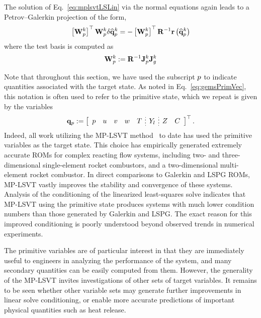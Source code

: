 The solution of Eq.~\ref{eq:mplsvtLSLin} via the normal equations again leads to a Petrov--Galerkin projection of the form,
%
\begin{equation}
    \left[\testBasisPrim^\newtonIdx\right]^\top \testBasisPrim^{\newtonIdx} \delta \primVecCoef^{\newtonIdx} = - \left[\testBasisPrim^{\newtonIdx}\right]^\top \resScaleInv \resFunc{\primVecCoef^{\newtonIdx}}
\end{equation}
%
where the test basis is computed as
%
\begin{equation}
    \testBasisPrim^{\newtonIdx} \defEq \resScaleInv \jacobPrim^{\newtonIdx} \jacobDecode^{\newtonIdx}
\end{equation}
%

Note that throughout this section, we have used the subscript $p$ to indicate quantities associated with the target state. As noted in Eq.~\ref{eq:gemsPrimVec}, this notation is often used to refer to the primitive state, which we repeat is given by the variables
%
\begin{equation}
    \primVec \defEq \left[
    \begin{array}{ccccc;{2pt/2pt}c;{2pt/2pt}cc}
    \pressure & \velX & \velY & \velZ & \temperature & \mfSpec & \mixFrac & \progVar
    \end{array}
    \right]^\top.
\end{equation}
%
Indeed, all work utilizing the MP-LSVT method~\cite{Huang2022,Wentland2021,Huang2022a} to date has used the primitive variables as the target state. This choice has empirically generated extremely accurate ROMs for complex reacting flow systems, including two- and three-dimensional single-element rocket combustors, and a two-dimensional multi-element rocket combustor. In direct comparisons to Galerkin and LSPG ROMs, MP-LSVT vastly improves the stability and convergence of these systems. Analysis of the conditioning of the linearized least-squares solve indicates that MP-LSVT using the primitive state produces systems with much lower condition numbers than those generated by Galerkin and LSPG. The exact reason for this improved conditioning is poorly understood beyond observed trends in numerical experiments.

The primitive variables are of particular interest in that they are immediately useful to engineers in analyzing the performance of the system, and many secondary quantities can be easily computed from them. However, the generality of the MP-LSVT invites investigations of other sets of target variables. It remains to be seen whether other variable sets may generate further improvements in linear solve conditioning, or enable more accurate predictions of important physical quantities such as heat release.